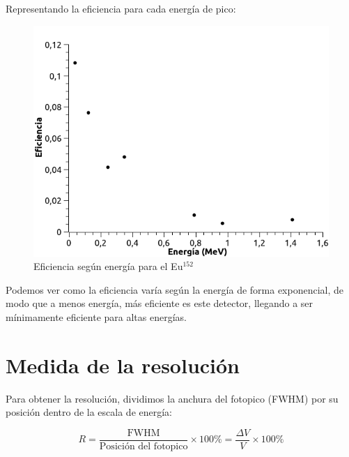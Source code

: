\documentclass[a4paper,12pt,spanish]{article}
\begin{document}
	Representando la eficiencia para cada energía de pico:
	
	
\begin{figure}[H]
	\centering
	\includegraphics[width=0.7\linewidth]{6_1eficienciaenergia}
	\caption{Eficiencia según energía para el Eu$^{152}$}
	\label{fig:61eficienciaenergia}
\end{figure}


Podemos ver como la eficiencia varía según la energía de forma exponencial, de modo que a menos energía, más eficiente es este detector, llegando a ser mínimamente eficiente para altas energías.



	
	\section{Medida de la resolución}
	
	Para obtener la resolución, dividimos la anchura del fotopico (FWHM) por su posición dentro de la escala de energía:
	
	\[R = \frac{\text{FWHM}}{\text{Posición del fotopico}}\times 100 \% = \frac{\Delta V}{V}\times 100 \% 
	\]
	
	
	
\end{document}
